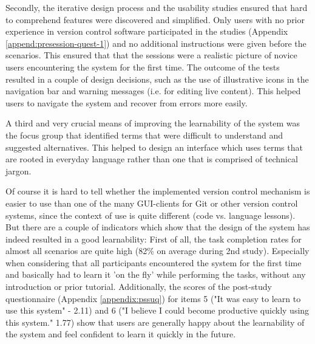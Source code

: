 Secondly, the iterative design process and the usability studies ensured that hard to comprehend features were discovered and simplified. Only users with no prior experience in version control software participated in the studies (Appendix \ref{append:presession-quest-1}) and no additional instructions were given before the scenarios. This ensured that that the sessions were a realistic picture of novice users encountering the system for the first time. The outcome of the tests resulted in a couple of design decisions, such as the use of illustrative icons in the navigation bar and warning messages (i.e. for editing live content). This helped users to navigate the system and recover from errors more easily.

A third and very crucial means of improving the learnability of the system was the focus group that identified terms that were difficult to understand and suggested alternatives. This helped to design an interface which uses terms that are rooted in everyday language rather than one that is comprised of technical jargon.

Of course it is hard to tell whether the implemented version control mechanism is easier to use than one of the many GUI-clients for Git or other version control systems, since the context of use is quite different (code vs. language lessons). But there are a couple of indicators which show that the design of the system has indeed resulted in a good learnability: First of all, the task completion rates for almost all scenarios are quite high (82\% on average during 2nd study). Especially when considering that all participants encountered the system for the first time and basically had to learn it 'on the fly' while performing the tasks, without any introduction or prior tutorial. Additionally, the scores of the post-study questionnaire (Appendix \ref{appendix:pssuq}) for items 5 ("It was easy to learn to use this system" - 2.11) and 6 ("I believe I could become productive quickly using this system." 1.77) show that users are generally happy about the learnability of the system and feel confident to learn it quickly in the future.



